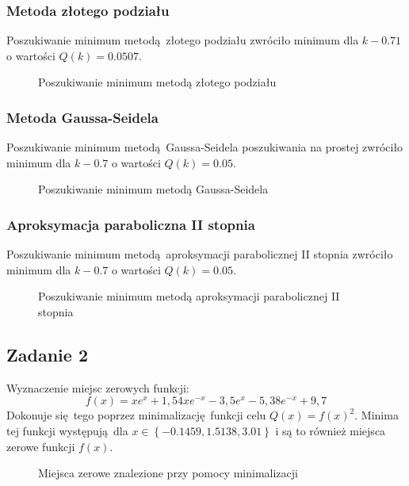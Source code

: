 \documentclass[a4paper, 12pt]{article}
\begin{document}
			\subsubsection{Metoda złotego podziału}
				Poszukiwanie minimum metodą złotego podziału zwróciło minimum dla $k - 0.71$ \newline o wartości $Q(k) = 0.0507$.
				\begin{figure}[H]
					\centering
					\def \svgwidth{0.7\columnwidth}
					
					\caption{Poszukiwanie minimum metodą złotego podziału}
				\end{figure}\noindent
			
			\subsubsection{Metoda Gaussa-Seidela}
				Poszukiwanie minimum metodą Gaussa-Seidela poszukiwania na prostej zwróciło minimum dla $k - 0.7$ \newline o wartości $Q(k) = 0.05$.
				\begin{figure}[H]
					\centering
					\def \svgwidth{0.65\columnwidth}
					
					\caption{Poszukiwanie minimum metodą Gaussa-Seidela}
				\end{figure}\noindent
			\subsubsection{Aproksymacja paraboliczna II stopnia}
				Poszukiwanie minimum metodą aproksymacji parabolicznej II stopnia zwróciło minimum dla $k - 0.7$ \newline o wartości $Q(k) = 0.05$.
				\begin{figure}[H]
					\centering
					\def \svgwidth{0.65\columnwidth}
					
					\caption{Poszukiwanie minimum metodą aproksymacji parabolicznej II stopnia}
				\end{figure}\noindent
		\subsection{Zadanie 2}
			Wyznaczenie miejsc zerowych funkcji:
			$$
				f(x) = x e^x + 1,54xe^{-x} - 3,5 e^x - 5,38e^{-x} + 9,7
			$$
			Dokonuje się tego poprzez minimalizację funkcji celu $Q(x) = f(x)^2$. Minima tej funkcji występują dla $x \in \left\lbrace-0.1459, 1.5138, 3.01\right\rbrace$ i są to również miejsca zerowe funkcji $f(x)$.
			\begin{figure}[H]
				\centering
				\def \svgwidth{\columnwidth}
				
				\caption{Miejsca zerowe znalezione przy pomocy minimalizacji}
			\end{figure}\noindent
			
\end{document}
